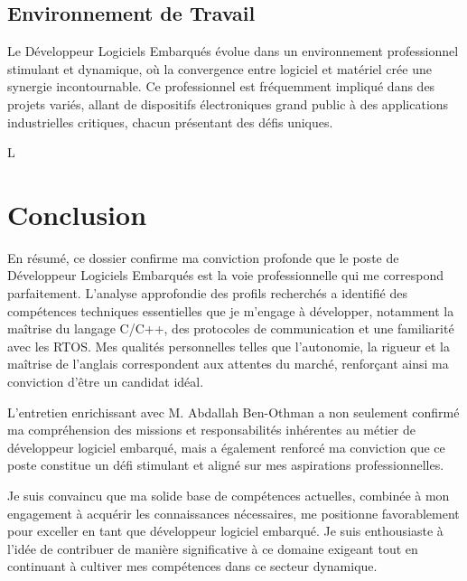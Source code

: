 \documentclass[a4paper,12pt]{report}
\begin{document}
\subsection{Environnement de Travail}

Le Développeur Logiciels Embarqués évolue dans un environnement professionnel stimulant et dynamique, où la convergence entre logiciel et matériel crée une synergie incontournable. Ce professionnel est fréquemment impliqué dans des projets variés, allant de dispositifs électroniques grand public à des applications industrielles critiques, chacun présentant des défis uniques.

L
\newpage

\section{Conclusion}

En résumé, ce dossier confirme ma conviction profonde que le poste de Développeur Logiciels Embarqués est la voie professionnelle qui me correspond parfaitement. L'analyse approfondie des profils recherchés a identifié des compétences techniques essentielles que je m'engage à développer, notamment la maîtrise du langage C/C++, des protocoles de communication et une familiarité avec les RTOS. Mes qualités personnelles telles que l'autonomie, la rigueur et la maîtrise de l'anglais correspondent aux attentes du marché, renforçant ainsi ma conviction d'être un candidat idéal.

L'entretien enrichissant avec M. Abdallah Ben-Othman a non seulement confirmé ma compréhension des missions et responsabilités inhérentes au métier de développeur logiciel embarqué, mais a également renforcé ma conviction que ce poste constitue un défi stimulant et aligné sur mes aspirations professionnelles.

Je suis convaincu que ma solide base de compétences actuelles, combinée à mon engagement à acquérir les connaissances nécessaires, me positionne favorablement pour exceller en tant que développeur logiciel embarqué. Je suis enthousiaste à l'idée de contribuer de manière significative à ce domaine exigeant tout en continuant à cultiver mes compétences dans ce secteur dynamique.
\end{document}
